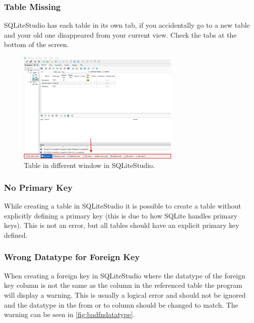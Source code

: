 \documentclass[a4paper,11pt,oneside]{article}
\begin{document}
\begin{sloppypar}
\subsubsection{Table Missing}
\label{sqliteStudioTableDisapered}
SQLiteStudio has each table in its own tab, if you accidentally go to a new table and your old one disappeared from your current view. Check the tabs at the bottom of the screen.
\begin{figure}[!htb]
  \centering
  \includegraphics[width=0.7\textwidth]{sqlitestudio/common_problems/table_disapered.png}
  \caption{Table in different window in SQLiteStudio.}
  \label{fig:tabledisapered}
\end{figure}


\subsubsection{No Primary Key}
\label{sqliteStudioNoPrimaryKey}
While creating a table in SQLiteStudio it is possible to create a table without explicitly defining a primary key (this is due to how SQLite handles primary keys). This is not an error, but all tables should have an explicit primary key defined.


\subsubsection{Wrong Datatype for Foreign Key}
\label{sqliteStudioWrongDatatypeForeignKey}
When creating a foreign key in SQLiteStudio where the datatype of the foreign key column is not the same as the column in the referenced table the program will display a warning. This is usually a logical error and should not be ignored and the datatype in the from or to column should be changed to match. The warning can be seen in \autoref{fig:badfndatatype}.



\end{sloppypar}
\end{document}
